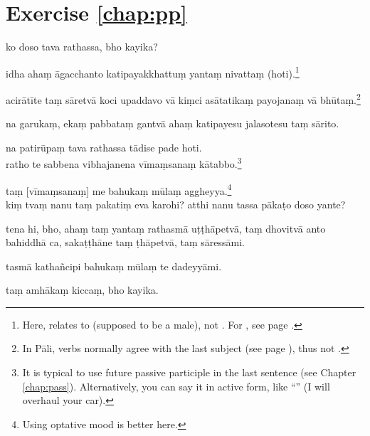 \section*{Exercise \ref{chap:pp}}
\begin{answerkey}
\item ko doso tava rathassa, bho kayika?
\item idha aha\d m \=agacchanto katipayakkhattu\d m yanta\d m nivatta\d m (hoti).\footnote{Here,  relates to  (supposed to be a male), not . For , see page \pageref{nip:kkhattudm}.}
\item acir\=at\=ite ta\d m s\=aretv\=a koci upaddavo v\=a ki\d mci as\=atatika\d m payojana\d m v\=a bh\=uta\d m.\footnote{In P\=ali, verbs normally agree with the last subject (see page \pageref{par:multiactors}), thus  not .}
\item na garuka\d m, eka\d m pabbata\d m gantv\=a aha\d m katipayesu jalasotesu ta\d m s\=arito.
\item na patir\=upa\d m tava rathassa t\=adise pade hoti. \\ratho te sabbena vibhajanena v\=ima\d msana\d m k\=atabbo.\footnote{It is typical to use future passive participle in the last sentence (see Chapter \ref{chap:pass}). Alternatively, you can say it in active form, like ``'' (I will overhaul your car).}
\item ta\d m [v\=ima\d msana\d m] me bahuka\d m m\=ula\d m aggheyya.\footnote{Using optative mood is better here.} \\ki\d m tva\d m nanu ta\d m pakati\d m eva karohi? atthi nanu tassa p\=aka\d to doso yante?
\item tena hi, bho, aha\d m ta\d m yanta\d m rathasm\=a u\d t\d th\=apetv\=a, ta\d m dhovitv\=a anto bahiddh\=a ca, saka\d t\d th\=ane ta\d m \d th\=apetv\=a, ta\d m s\=aress\=ami.
\item tasm\=a katha\~ncipi bahuka\d m m\=ula\d m te dadeyy\=ami.
\item ta\d m amh\=aka\d m kicca\d m, bho kayika.
\end{answerkey}

